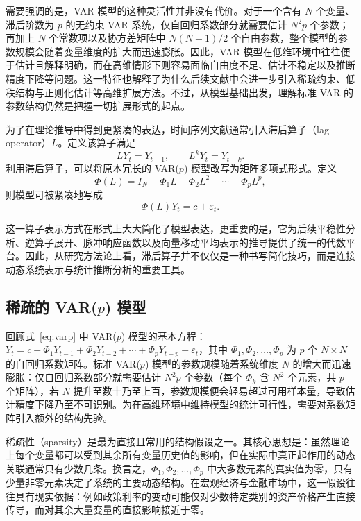 需要强调的是，VAR 模型的这种灵活性并非没有代价。对于一个含有 $N$ 个变量、滞后阶数为 $p$ 的无约束 VAR 系统，仅自回归系数部分就需要估计 $N^2p$ 个参数；再加上 $N$ 个常数项以及协方差矩阵中 $N(N+1)/2$ 个自由参数，整个模型的参数规模会随着变量维度的扩大而迅速膨胀。因此，VAR 模型在低维环境中往往便于估计且解释明确，而在高维情形下则容易面临自由度不足、估计不稳定以及推断精度下降等问题。这一特征也解释了为什么后续文献中会进一步引入稀疏约束、低秩结构与正则化估计等高维扩展方法。不过，从模型基础出发，理解标准 VAR 的参数结构仍然是把握一切扩展形式的起点。

为了在理论推导中得到更紧凑的表达，时间序列文献通常引入滞后算子（lag operator）$L$。定义该算子满足
\begin{equation}
LY_t=Y_{t-1}, \qquad L^kY_t=Y_{t-k}.
\end{equation}
利用滞后算子，可以将原本冗长的 VAR($p$) 模型改写为矩阵多项式形式。定义
\begin{equation}
\Phi(L)=I_N-\Phi_1L-\Phi_2L^2-\cdots-\Phi_pL^p,
\end{equation}
则模型可被紧凑地写成
\begin{equation}
\Phi(L)Y_t = c + \varepsilon_t.
\end{equation}

这一算子表示方式在形式上大大简化了模型表达，更重要的是，它为后续平稳性分析、逆算子展开、脉冲响应函数以及向量移动平均表示的推导提供了统一的代数平台。因此，从研究方法论上看，滞后算子并不仅仅是一种书写简化技巧，而是连接动态系统表示与统计推断分析的重要工具。

\subsection{稀疏的 \texorpdfstring{VAR($p$)}{VAR(p)} 模型}

回顾式~\eqref{eq:varp} 中 VAR($p$) 模型的基本方程：$Y_t = c + \Phi_1 Y_{t-1} + \Phi_2 Y_{t-2} + \cdots + \Phi_p Y_{t-p} + \varepsilon_t$，其中 $\Phi_1,\Phi_2,\dots,\Phi_p$ 为 $p$ 个 $N\times N$ 的自回归系数矩阵。标准 VAR($p$) 模型的参数规模随着系统维度 $N$ 的增大而迅速膨胀：仅自回归系数部分就需要估计 $N^2p$ 个参数（每个 $\Phi_k$ 含 $N^2$ 个元素，共 $p$ 个矩阵），若 $N$ 提升至数十乃至上百，参数规模便会轻易超过可用样本量，导致估计精度下降乃至不可识别。为在高维环境中维持模型的统计可行性，需要对系数矩阵引入额外的结构先验。

稀疏性（sparsity）是最为直接且常用的结构假设之一。其核心思想是：虽然理论上每个变量都可以受到其余所有变量历史值的影响，但在实际中真正起作用的动态关联通常只有少数几条。换言之，$\Phi_1,\Phi_2,\dots,\Phi_p$ 中大多数元素的真实值为零，只有少量非零元素决定了系统的主要动态结构。在宏观经济与金融市场中，这一假设往往具有现实依据：例如政策利率的变动可能仅对少数特定类别的资产价格产生直接传导，而对其余大量变量的直接影响接近于零。

